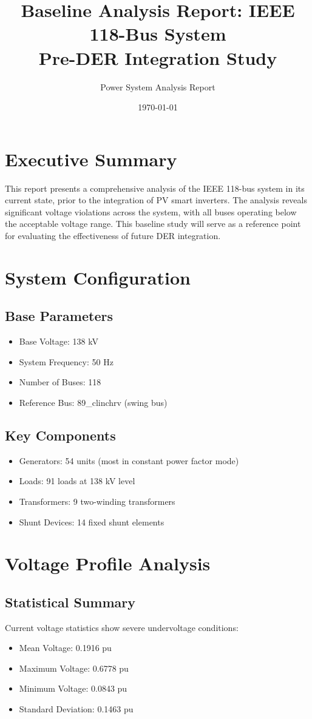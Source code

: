 \documentclass[11pt]{article}
\title{Baseline Analysis Report: IEEE 118-Bus System\\Pre-DER Integration Study}
\author{Power System Analysis Report}
\date{\today}
\begin{document}
\maketitle

\section{Executive Summary}
This report presents a comprehensive analysis of the IEEE 118-bus system in its current state, prior to the integration of PV smart inverters. The analysis reveals significant voltage violations across the system, with all buses operating below the acceptable voltage range. This baseline study will serve as a reference point for evaluating the effectiveness of future DER integration.

\section{System Configuration}
\subsection{Base Parameters}
\begin{itemize}
    \item Base Voltage: 138 kV
    \item System Frequency: 50 Hz
    \item Number of Buses: 118
    \item Reference Bus: 89\_clinchrv (swing bus)
\end{itemize}

\subsection{Key Components}
\begin{itemize}
    \item Generators: 54 units (most in constant power factor mode)
    \item Loads: 91 loads at 138 kV level
    \item Transformers: 9 two-winding transformers
    \item Shunt Devices: 14 fixed shunt elements
\end{itemize}

\section{Voltage Profile Analysis}
\subsection{Statistical Summary}
Current voltage statistics show severe undervoltage conditions:
\begin{itemize}
    \item Mean Voltage: 0.1916 pu
    \item Maximum Voltage: 0.6778 pu
    \item Minimum Voltage: 0.0843 pu
    \item Standard Deviation: 0.1463 pu
\end{itemize}
\end{document}
